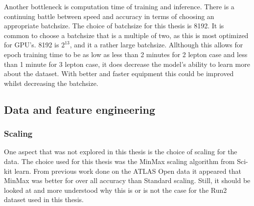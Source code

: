 Another bottleneck is computation time of training and inference. 
There is a continuing battle between speed and accuracy in terms of choosing an appropriate batchsize. 
The choice of batchsize for this thesis is 8192. It is common to choose a batchsize that is a multiple of two, 
as this is most optimized for GPU's. 8192 is $2^{13}$, and it a rather large batchsize. Allthough this allows for 
epoch training time to be as low as less than 2 minutes for 2 lepton case and less than 1 minute for 3 lepton case,
it does decrease the model's ability to learn more about the dataset\cite{Goodfellow-et-al-2016}. With better and faster equipment this could 
be improved whilst decreasing the batchsize. 


\subsection*{Data and feature engineering}
\subsubsection*{Scaling}
One aspect that was not explored in this thesis is the choice of scaling for the data. The choice used for this 
thesis was the MinMax scaling algorithm from Sci-kit learn. From previous work done on the ATLAS Open data 
\cite{ATL-OREACH-PUB-2020-001} it appeared that MinMax was better for over all accuracy than Standard scaling.
Still, it should be looked at and more understood why this is or is not the case for the Run2 dataset used in this 
thesis. 

